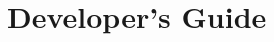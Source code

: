 \documentclass{InsightSoftwareGuide}
\newif\ifitkFullVersion
\newif\ifitkPrintedVersion
\begin{document}
\part{Developer's Guide}


%

%

\backmatter


%
%





%
%



%
\end{document}
